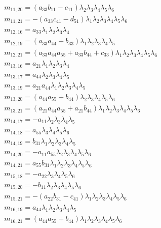 \documentclass{article}
\begin{document}
\begin{align*}
&m_{11,20}={\left(a_{33} b_{11} - c_{11}\right)} \lambda_{2} \lambda_{3} \lambda_{4} \lambda_{5} \lambda_{6}\\
&m_{11,21}=-{\left(a_{33} c_{41} - d_{51}\right)} \lambda_{1} \lambda_{2} \lambda_{3} \lambda_{4} \lambda_{5} \lambda_{6}\\
&m_{12,16}=a_{33} \lambda_{1} \lambda_{2} \lambda_{3} \lambda_{4}\\
&m_{12,19}={\left(a_{33} a_{44} + b_{33}\right)} \lambda_{1} \lambda_{2} \lambda_{3} \lambda_{4} \lambda_{5}\\
&m_{12,21}={\left(a_{33} a_{44} a_{55} + a_{33} b_{44} + c_{33}\right)} \lambda_{1} \lambda_{2} \lambda_{3} \lambda_{4} \lambda_{5} \lambda_{6}\\
&m_{13,16}=a_{21} \lambda_{1} \lambda_{2} \lambda_{3} \lambda_{4}\\
&m_{13,17}=a_{44} \lambda_{2} \lambda_{3} \lambda_{4} \lambda_{5}\\
&m_{13,19}=a_{21} a_{44} \lambda_{1} \lambda_{2} \lambda_{3} \lambda_{4} \lambda_{5}\\
&m_{13,20}={\left(a_{44} a_{55} + b_{44}\right)} \lambda_{2} \lambda_{3} \lambda_{4} \lambda_{5} \lambda_{6}\\
&m_{13,21}={\left(a_{21} a_{44} a_{55} + a_{21} b_{44}\right)} \lambda_{1} \lambda_{2} \lambda_{3} \lambda_{4} \lambda_{5} \lambda_{6}\\
&m_{14,17}=-a_{11} \lambda_{2} \lambda_{3} \lambda_{4} \lambda_{5}\\
&m_{14,18}=a_{55} \lambda_{3} \lambda_{4} \lambda_{5} \lambda_{6}\\
&m_{14,19}=b_{31} \lambda_{1} \lambda_{2} \lambda_{3} \lambda_{4} \lambda_{5}\\
&m_{14,20}=-a_{11} a_{55} \lambda_{2} \lambda_{3} \lambda_{4} \lambda_{5} \lambda_{6}\\
&m_{14,21}=a_{55} b_{31} \lambda_{1} \lambda_{2} \lambda_{3} \lambda_{4} \lambda_{5} \lambda_{6}\\
&m_{15,18}=-a_{22} \lambda_{3} \lambda_{4} \lambda_{5} \lambda_{6}\\
&m_{15,20}=-b_{11} \lambda_{2} \lambda_{3} \lambda_{4} \lambda_{5} \lambda_{6}\\
&m_{15,21}=-{\left(a_{22} b_{31} - c_{41}\right)} \lambda_{1} \lambda_{2} \lambda_{3} \lambda_{4} \lambda_{5} \lambda_{6}\\
&m_{16,19}=a_{44} \lambda_{1} \lambda_{2} \lambda_{3} \lambda_{4} \lambda_{5}\\
&m_{16,21}={\left(a_{44} a_{55} + b_{44}\right)} \lambda_{1} \lambda_{2} \lambda_{3} \lambda_{4} \lambda_{5} \lambda_{6}\\
\end{align*}
\end{document}
